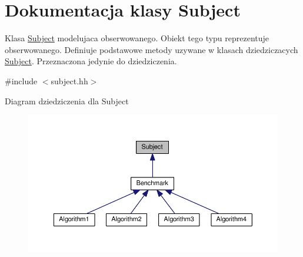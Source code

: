 \hypertarget{class_subject}{\section{Dokumentacja klasy Subject}
\label{class_subject}
}


Klasa \hyperlink{class_subject}{Subject} modelujaca obserwowanego. Obiekt tego typu reprezentuje obserwowanego. Definiuje podstawowe metody uzywane w klasach dziedziczacych \hyperlink{class_subject}{Subject}. Przeznaczona jedynie do dziedziczenia.  




{\ttfamily \#include $<$subject.\-hh$>$}



Diagram dziedziczenia dla Subject\nopagebreak
\begin{figure}[H]
\begin{center}
\leavevmode
\includegraphics[width=350pt]{class_subject__inherit__graph}
\end{center}
\end{figure}
